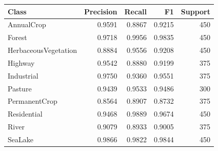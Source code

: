 \begin{tabular}{lrrrr}
\toprule
Class & Precision & Recall & F1 & Support \\
\midrule
AnnualCrop & 0.9591 & 0.8867 & 0.9215 & 450 \\
Forest & 0.9718 & 0.9956 & 0.9835 & 450 \\
HerbaceousVegetation & 0.8884 & 0.9556 & 0.9208 & 450 \\
Highway & 0.9542 & 0.8880 & 0.9199 & 375 \\
Industrial & 0.9750 & 0.9360 & 0.9551 & 375 \\
Pasture & 0.9439 & 0.9533 & 0.9486 & 300 \\
PermanentCrop & 0.8564 & 0.8907 & 0.8732 & 375 \\
Residential & 0.9468 & 0.9889 & 0.9674 & 450 \\
River & 0.9079 & 0.8933 & 0.9005 & 375 \\
SeaLake & 0.9866 & 0.9822 & 0.9844 & 450 \\
\bottomrule
\end{tabular}
